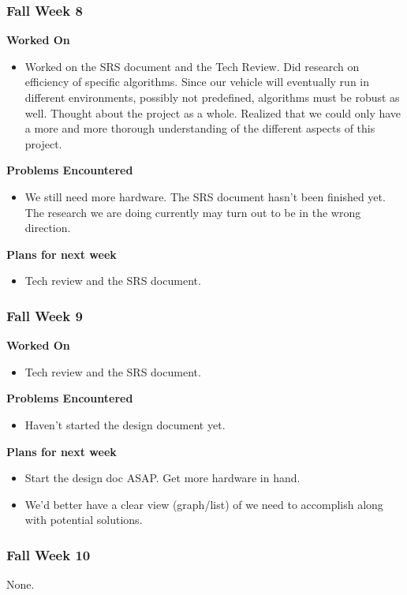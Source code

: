 \documentclass[compsoc,draftclsnofoot,onecolumn,10pt]{IEEEtran}
\begin{document}
\subsubsection*{Fall Week 8}
\textbf{Worked On}
\begin{itemize}
  \item Worked on the SRS document and the Tech Review. Did research on
  efficiency of specific algorithms. Since our vehicle will eventually
  run in different environments, possibly not predefined, algorithms
  must be robust as well. Thought about the project as a whole. Realized
  that we could only have a more and more thorough understanding of the
  different aspects of this project.
\end{itemize}
\textbf{Problems Encountered}
\begin{itemize}
  \item We still need more hardware. The SRS document hasn't been
  finished yet. The research we are doing currently may turn out to be
  in the wrong direction.
\end{itemize}
\textbf{Plans for next week}
\begin{itemize}
  \item Tech review and the SRS document.
\end{itemize}


\subsubsection*{Fall Week 9}
\textbf{Worked On}
\begin{itemize}
  \item Tech review and the SRS document.
\end{itemize}
\textbf{Problems Encountered}
\begin{itemize}
  \item Haven't started the design document yet.
\end{itemize}
\textbf{Plans for next week}
\begin{itemize}
  \item Start the design doc ASAP. Get more hardware in hand.
  \item We'd better have a clear view (graph/list) of we need
  to accomplish along with potential solutions.
\end{itemize}


\subsubsection*{Fall Week 10}
None.
\end{document}
